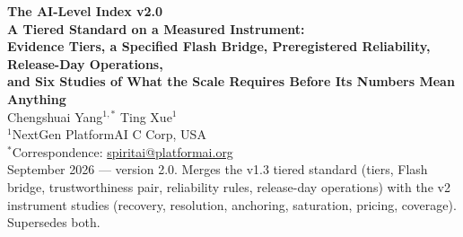 
\begin{center}
{\LARGE\bfseries The AI-Level Index v2.0}\\[6pt]
{\large\bfseries A Tiered Standard on a Measured Instrument:\\[2pt] Evidence Tiers, a Specified Flash Bridge, Preregistered Reliability, Release-Day Operations,\\[2pt] and Six Studies of What the Scale Requires Before Its Numbers Mean Anything}\\[14pt]
{\large Chengshuai Yang$^{1,*}$ \quad Ting Xue$^{1}$}\\[5pt]
{\normalsize $^{1}$NextGen PlatformAI C Corp, USA}\\[4pt]
{\normalsize $^{*}$Correspondence: \href{mailto:spiritai@platformai.org}{spiritai@platformai.org}}\\[10pt]
{\small September 2026 --- version 2.0. Merges the v1.3 tiered standard (tiers, Flash bridge, trustworthiness pair, reliability rules, release-day operations) with the v2 instrument studies (recovery, resolution, anchoring, saturation, pricing, coverage). Supersedes both.}
\end{center}


